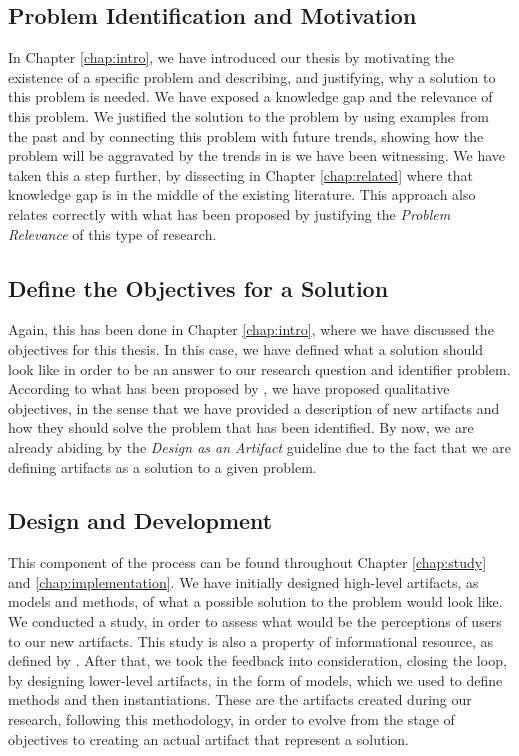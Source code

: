 \subsection{Problem Identification and Motivation}

In Chapter \ref{chap:intro}, we have introduced our thesis by motivating the existence of a specific problem and describing, and justifying, why a solution to this problem is needed. We have exposed a knowledge gap and the relevance of this problem. We justified the solution to the problem by using examples from the past and by connecting this problem with future trends, showing how the problem will be aggravated by the trends in \gls{is} we have been witnessing. We have taken this a step further, by dissecting in Chapter \ref{chap:related} where that knowledge gap is in the middle of the existing literature. This approach also relates correctly with what has been proposed \citeauthor{Hevner:2004:DSI:2017212.2017217} by justifying the \textit{Problem Relevance} of this type of research.

\subsection{Define the Objectives for a Solution}

Again, this has been done in Chapter \ref{chap:intro}, where we have discussed the objectives for this thesis. In this case, we have defined what a solution should look like in order to be an answer to our research question and identifier problem. According to what has been proposed by \citeauthor{10.2307/40398896}, we have proposed qualitative objectives, in the sense that we have provided a description of new artifacts and how they should solve the problem that has been identified. By now, we are already abiding by the \textit{Design as an Artifact} guideline \cite{Hevner:2004:DSI:2017212.2017217} due to the fact that we are defining artifacts as a solution to a given problem.

\subsection{Design and Development}

This component of the process can be found throughout Chapter \ref{chap:study} and \ref{chap:implementation}. We have initially designed high-level artifacts, as models and methods, of what a possible solution to the problem would look like. We conducted a study, in order to assess what would be the perceptions of users to our new artifacts. This study is also a property of informational resource, as defined by \citeauthor{10.2307/40398896}. After that, we took the feedback into consideration, closing the loop, by designing lower-level artifacts, in the form of models, which we used to define methods and then instantiations. These are the artifacts created during our research, following this methodology, in order to evolve from the stage of objectives to creating an actual artifact that represent a solution.

